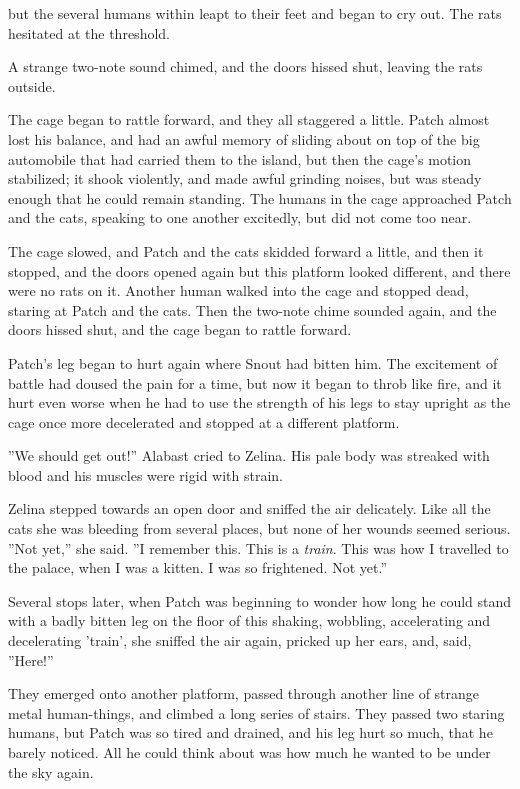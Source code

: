 \documentclass[11pt]{article}
\begin{document}
 but the several humans within leapt to their feet and began to cry out. The rats hesitated at the threshold.\par
A strange two-note sound chimed, and the doors hissed shut, leaving the rats outside.\par
 The cage began to rattle forward, and they all staggered a little. Patch almost lost his balance, and had an awful memory of sliding about on top of the big automobile that had carried them to the island, but then the cage's motion stabilized; it shook violently, and made awful grinding noises, but was steady enough that he could remain standing. The humans in the cage approached Patch and the cats, speaking to one another excitedly, but did not come too near.\par
The cage slowed, and Patch and the cats skidded forward a little, and then it stopped, and the doors opened again %
 but this platform looked different, and there were no rats on it. Another human walked into the cage and stopped dead, staring at Patch and the cats. Then the two-note chime sounded again, and the doors hissed shut, and the cage began to rattle forward.\par
 Patch's leg began to hurt again where Snout had bitten him. The excitement of battle had doused the pain for a time, but now it began to throb like fire, and it hurt even worse when he had to use the strength of his legs to stay upright as the cage once more decelerated and stopped at a different platform.\par
 ''We should get out!'' Alabast cried to Zelina. His pale body was streaked with blood and his muscles were rigid with strain.\par
 Zelina stepped towards an open door and sniffed the air delicately. Like all the cats she was bleeding from several places, but none of her wounds seemed serious. ''Not yet,'' she said. ''I remember this. This is a {\it train}. This was how I travelled to the palace, when I was a kitten. I was so frightened. Not yet.''\par
 Several stops later, when Patch was beginning to wonder how long he could stand with a badly bitten leg on the floor of this shaking, wobbling, accelerating and decelerating 'train', she sniffed the air again, pricked up her ears, and, said, ''Here!''\par
 They emerged onto another platform, passed through another line of strange metal human-things, and climbed a long series of stairs. They passed two staring humans, but Patch was so tired and drained, and his leg hurt so much, that he barely noticed. All he could think about was how much he wanted to be under the sky again.\par
\end{document}
